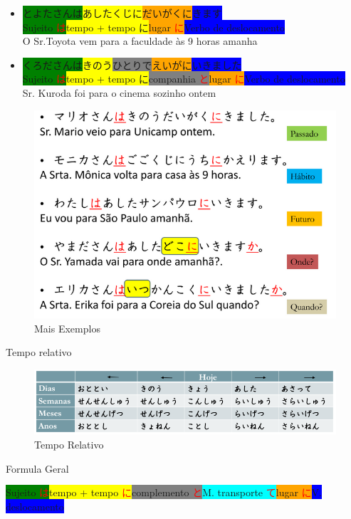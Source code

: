 \documentclass[a4paper, 12pt]{article}
\begin{document}
\begin{CJK}{UTF8}{min}
\begin{itemize}
			\item \colorbox{green}{とよたさんは}\colorbox{yellow}{あしたくじに}\colorbox{orange}{だいがくに}\colorbox{blue}{きます}\\
			\colorbox{green}{Sujeito \textcolor{red}{は}}\colorbox{yellow}{tempo + tempo に}\colorbox{orange}{lugar \textcolor{red}{に}}\colorbox{blue}{Verbo de deslocamento}\\
			O Sr.Toyota vem para a faculdade às 9 horas amanha
			
			\item \colorbox{green}{くろださんは}\colorbox{yellow}{きのう}\colorbox{gray}{ひとりで}\colorbox{orange}{えいがに}\colorbox{blue}{いきました}\\
			\colorbox{green}{Sujeito \textcolor{red}{は}}\colorbox{yellow}{tempo + tempo に}\colorbox{gray}{companhia \textcolor{red}{と}}\colorbox{orange}{lugar \textcolor{red}{に}}\colorbox{blue}{Verbo de deslocamento}\\
			Sr. Kuroda foi para o cinema sozinho ontem

		\end{itemize}
		
		\begin{figure}[h]
			\centering
			\includegraphics[width=0.7\linewidth]{Imagens/ex1}
			\caption{Mais Exemplos}
			\label{fig:ex1}
		\end{figure}
	\newpage
	\Large
	Tempo relativo\\
	\normalsize	
	\begin{figure}[h]
		\centering
		\includegraphics[width=1\linewidth]{Imagens/tempo_relativo}
		\caption{Tempo Relativo}
		\label{fig:temporelativo}
	\end{figure}
		
	\Large
	Formula Geral\\
	\normalsize
	
	\colorbox{green}{Sujeito \textcolor{red}{は}}\colorbox{yellow}{tempo + tempo \textcolor{red}{に}}\colorbox{gray}{complemento \textcolor{red}{と}}\colorbox{cyan}{M. transporte \textcolor{red}{て}}\colorbox{orange}{lugar \textcolor{red}{に}}\colorbox{blue}{V. deslocamento}\\

		
	\end{CJK}
\end{document}
